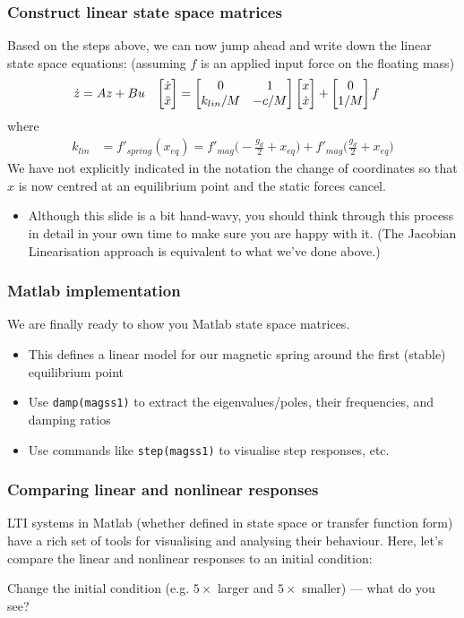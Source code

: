 \documentclass[9pt]{beamer-control}
\begin{document}
\begin{frame}
\frametitle{Construct linear state space matrices}
Based on the steps above, we can now jump ahead and write down the linear state space equations: (assuming $f$ is an applied input force on the floating mass)
\begin{align}
\dot z &= Az + Bu &
\begin{bmatrix} \dot x \\ \ddot x \end{bmatrix} &= \begin{bmatrix} 0 & 1 \\ k_{lin}/M & -c/M \end{bmatrix} \begin{bmatrix} x\\ \dot x \end{bmatrix} + \begin{bmatrix}0 \\ 1/M\end{bmatrix}f
\end{align}
where
\begin{align}
k_{lin} &= f'_{spring}(x_{eq}) = f'_{mag}\bigl(-\tfrac{g_d}{2}+x_{eq}\bigr) + f'_{mag}\bigl(\tfrac{g_d}{2}+x_{eq}\bigr)
\end{align}
We have not explicitly indicated in the notation the change of coordinates so that $x$ is now centred at an equilibrium point and the static forces cancel.

\begin{itemize}
\item \scriptsize Although this slide is a bit hand-wavy, you should think through this process in detail in your own time to make sure you are happy with it.
(The Jacobian Linearisation approach is equivalent to what we've done above.)
\end{itemize}
\end{frame}

\begin{frame}
\frametitle{Matlab implementation}
\alert{We are finally ready to show you Matlab state space matrices.}


\begin{itemize}
\item This defines a linear model for our magnetic spring around the first (stable) equilibrium point
\item Use \texttt{damp(magss1)} to extract the eigenvalues/poles, their frequencies, and damping ratios
\item Use commands like \texttt{step(magss1)} to visualise step responses, etc.
\end{itemize}

\end{frame}

\begin{frame}
\frametitle{Comparing linear and nonlinear responses}
LTI systems in Matlab (whether defined in state space or transfer function form) have a rich set of tools for visualising and analysing their behaviour. Here, let's compare the linear and nonlinear responses to an initial condition:


Change the initial condition (e.g. $5\times$ larger and $5\times$ smaller) --- what do you see?

\end{frame}
\end{document}
